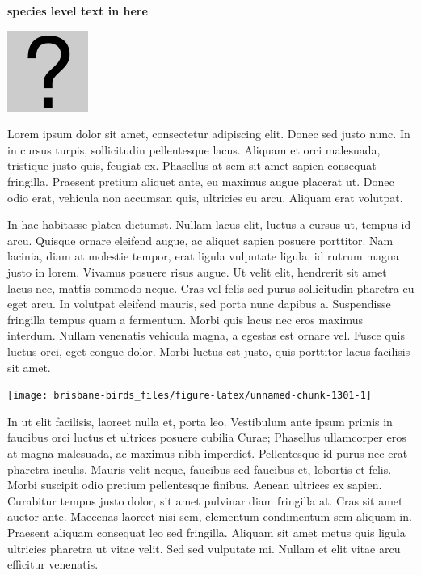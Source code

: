 \documentclass[]{book}
\let\origfigure\figure
\let\endorigfigure\endfigure
\renewenvironment{figure}[1][2] {
  \expandafter\origfigure\expandafter[H]
} {
  \endorigfigure
}
\begin{document}
\textbf{species level text in here}

\begin{figure}
\centering
\includegraphics{assets/missing.png}
\caption{No image for species}
\end{figure}

Lorem ipsum dolor sit amet, consectetur adipiscing elit. Donec sed justo
nunc. In in cursus turpis, sollicitudin pellentesque lacus. Aliquam et
orci malesuada, tristique justo quis, feugiat ex. Phasellus at sem sit
amet sapien consequat fringilla. Praesent pretium aliquet ante, eu
maximus augue placerat ut. Donec odio erat, vehicula non accumsan quis,
ultricies eu arcu. Aliquam erat volutpat.

In hac habitasse platea dictumst. Nullam lacus elit, luctus a cursus ut,
tempus id arcu. Quisque ornare eleifend augue, ac aliquet sapien posuere
porttitor. Nam lacinia, diam at molestie tempor, erat ligula vulputate
ligula, id rutrum magna justo in lorem. Vivamus posuere risus augue. Ut
velit elit, hendrerit sit amet lacus nec, mattis commodo neque. Cras vel
felis sed purus sollicitudin pharetra eu eget arcu. In volutpat eleifend
mauris, sed porta nunc dapibus a. Suspendisse fringilla tempus quam a
fermentum. Morbi quis lacus nec eros maximus interdum. Nullam venenatis
vehicula magna, a egestas est ornare vel. Fusce quis luctus orci, eget
congue dolor. Morbi luctus est justo, quis porttitor lacus facilisis sit
amet.

\begin{figure}
\texttt{[image: brisbane-birds\_files/figure-latex/unnamed-chunk-1301-1]} \caption{insert figure caption}\label{fig:unnamed-chunk-1301}
\end{figure}

In ut elit facilisis, laoreet nulla et, porta leo. Vestibulum ante ipsum
primis in faucibus orci luctus et ultrices posuere cubilia Curae;
Phasellus ullamcorper eros at magna malesuada, ac maximus nibh
imperdiet. Pellentesque id purus nec erat pharetra iaculis. Mauris velit
neque, faucibus sed faucibus et, lobortis et felis. Morbi suscipit odio
pretium pellentesque finibus. Aenean ultrices ex sapien. Curabitur
tempus justo dolor, sit amet pulvinar diam fringilla at. Cras sit amet
auctor ante. Maecenas laoreet nisi sem, elementum condimentum sem
aliquam in. Praesent aliquam consequat leo sed fringilla. Aliquam sit
amet metus quis ligula ultricies pharetra ut vitae velit. Sed sed
vulputate mi. Nullam et elit vitae arcu efficitur venenatis.
\end{document}

